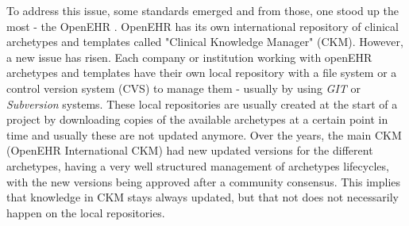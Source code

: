 \documentclass[mim_thesis.tex]{subfiles}
\begin{document}
To address this issue, some standards emerged and from those, one stood up the most - the OpenEHR \citep{openEHRdeploy2017}. OpenEHR has its own international repository of clinical archetypes and templates called "Clinical Knowledge Manager" (CKM). However, a new issue has risen. Each company or institution working with openEHR archetypes and templates have their own local repository with a file system or a control version system (CVS) to manage them - usually by using \textit{GIT} or \textit{Subversion} systems. These local repositories are usually created at the start of a project by downloading copies of the available archetypes at a certain point in time and usually these are not updated anymore. Over the years, the main CKM (OpenEHR International CKM) had new updated versions for the different archetypes, having a very well structured management of archetypes lifecycles, with the new versions being approved after a community consensus. This implies that knowledge in CKM stays always updated, but that not does not necessarily happen on the local repositories. 
\end{document}
